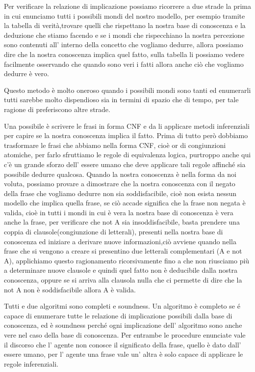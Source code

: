		Per verificare la relazione di implicazione possiamo ricorrere a due strade la prima in cui enunciamo tutti i possibili mondi del nostro modello, per esempio tramite la tabella di verità,trovare quelli che rispettano la nostra base di conoscenza e la deduzione che stiamo facendo e se i mondi che rispecchiano la nostra percezione sono contenuti all' interno della concetto che vogliamo dedurre, allora possiamo dire che la nostra conoscenza implica quel fatto, sulla tabella li possiamo vedere facilmente osservando che quando sono veri i fatti allora anche ciò che vogliamo dedurre è vero.
		\par
		Questo metodo è molto oneroso quando i possibili mondi sono tanti ed enumerarli tutti sarebbe molto dispendioso sia in termini di spazio che di tempo, per tale ragione di preferiscono altre strade.
		\par
		Una possibile è scrivere le frasi in forma CNF e da li applicare metodi inferenziali per capire se la nostra conoscenza implica il fatto. 
		Prima di tutto però dobbiamo trasformare le frasi che abbiamo nella forma CNF, cioè or di congiunzioni atomiche, per farlo sfruttiamo le regole di equivalenza logica, purtroppo anche qui c'è un grande sforzo dell' essere umano che deve applicare tali regole affinché sia possibile dedurre qualcosa.
		Quando la nostra conoscenza è nella forma da noi voluta, possiamo provare a dimostrare che la nostra conoscenza con il negato della frase che vogliamo dedurre non sia soddisfacibile, cioè non esista nessun modello che implica quella frase, se ciò accade significa che la frase non negata è valida, cioè in tutti i mondi in cui è vera la nostra base di conoscenza è vera anche la frase, per verificare che not A sia insoddisfacibile, basta prendere una coppia di clausole(congiunzione di letterali), presenti nella nostra base di conoscenza ed iniziare a derivare nuove informazioni,ciò avviene quando nella frase che si vengono a creare si presentino due letterali complementari (A e not A),
		applichiamo questo ragionamento ricorsivamente fino a che non riusciamo più a determinare nuove clausole e quindi quel fatto non è deducibile dalla nostra conoscenza, oppure se si arriva alla clausola nulla che ci permette di dire che la not A non è soddisfacibile allora A è valida.
		\par
		Tutti e due algoritmi sono completi e soundness.
		Un algoritmo è completo se é capace di enumerare tutte le relazione di implicazione possibili dalla base di conoscenza, ed è soundness perché ogni implicazione dell' algoritmo sono anche vere nel caso della base di conoscenza.
		Per entrambe le procedure enunciate vale il discorso che l' agente non conosce il significato della frase, quello è dato dall' essere umano, per l' agente una frase vale un' altra è solo capace di applicare le regole inferenziali.
		
